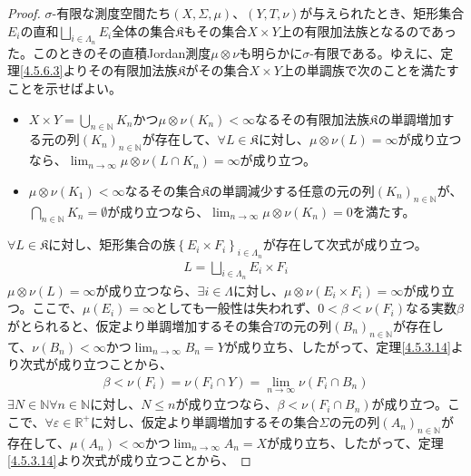 \documentclass[dvipdfmx]{jsarticle}
\begin{document}
\begin{proof}
$\sigma$-有限な測度空間たち$(X,\varSigma,\mu)$、$(Y,T,\nu)$が与えられたとき、矩形集合$E_{i}$の直和$\bigsqcup_{i \in \varLambda_{n}} E_{i}$全体の集合$\mathfrak{K}$もその集合$X \times Y$上の有限加法族となるのであった。このときのその直積Jordan測度$\mu \otimes \nu$も明らかに$\sigma$-有限である。ゆえに、定理\ref{4.5.6.3}よりその有限加法族$\mathfrak{K}$がその集合$X \times Y$上の単調族で次のことを満たすことを示せばよい。
\begin{itemize}
\item
  $X \times Y = \bigcup_{n \in \mathbb{N}} K_{n}$かつ$\mu \otimes \nu\left( K_{n} \right) < \infty$なるその有限加法族$\mathfrak{K}$の単調増加する元の列$\left( K_{n} \right)_{n \in \mathbb{N}}$が存在して、$\forall L \in \mathfrak{K}$に対し、$\mu \otimes \nu(L) = \infty$が成り立つなら、$\lim_{n \rightarrow \infty}{\mu \otimes \nu\left( L \cap K_{n} \right)} = \infty$が成り立つ。
\item
  $\mu \otimes \nu\left( K_{1} \right) < \infty$なるその集合$\mathfrak{K}$の単調減少する任意の元の列$\left( K_{n} \right)_{n \in \mathbb{N}}$が、$\bigcap_{n \in \mathbb{N}} K_{n} = \emptyset$が成り立つなら、$\lim_{n \rightarrow \infty}{\mu \otimes \nu\left( K_{n} \right)} = 0$を満たす。
\end{itemize}\par
$\forall L \in \mathfrak{K}$に対し、矩形集合の族$\left\{ E_{i} \times F_{i} \right\}_{i \in \varLambda_{n}}$が存在して次式が成り立つ。
\begin{align*}
L = \bigsqcup_{i \in \varLambda_{n} } {E_{i} \times F_{i}}
\end{align*}
$\mu \otimes \nu(L) = \infty$が成り立つなら、$\exists i \in \varLambda$に対し、$\mu \otimes \nu\left( E_{i} \times F_{i} \right) = \infty$が成り立つ。ここで、$\mu\left( E_{i} \right) = \infty$としても一般性は失われず、$0 < \beta < \nu\left( F_{i} \right)$なる実数$\beta$がとられると、仮定より単調増加するその集合$T$の元の列$\left( B_{n} \right)_{n \in \mathbb{N}}$が存在して、$\nu\left( B_{n} \right) < \infty$かつ$\lim_{n \rightarrow \infty}B_{n} = Y$が成り立ち、したがって、定理\ref{4.5.3.14}より次式が成り立つことから、
\begin{align*}
\beta < \nu\left( F_{i} \right) = \nu\left( F_{i} \cap Y \right) = \lim_{n \rightarrow \infty}{\nu\left( F_{i} \cap B_{n} \right)}
\end{align*}
$\exists N \in \mathbb{N}\forall n \in \mathbb{N}$に対し、$N \leq n$が成り立つなら、$\beta < \nu\left( F_{i} \cap B_{n} \right)$が成り立つ。ここで、$\forall\varepsilon \in \mathbb{R}^{+}$に対し、仮定より単調増加するその集合$\varSigma$の元の列$\left( A_{n} \right)_{n \in \mathbb{N}}$が存在して、$\mu\left( A_{n} \right) < \infty$かつ$\lim_{n \rightarrow \infty}A_{n} = X$が成り立ち、したがって、定理\ref{4.5.3.14}より次式が成り立つことから、

\end{proof}
\end{document}
